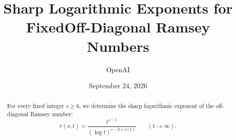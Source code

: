 \documentclass[11pt]{article}
\title{Sharp Logarithmic Exponents for Fixed\newline Off-Diagonal Ramsey Numbers}
\author{OpenAI}
\date{September 24, 2026}
\numberwithin{equation}{section}
\theoremstyle{definition}
\theoremstyle{remark}
\begin{document}
\maketitle
\begin{abstract}
For every fixed integer $s\ge6$, we determine the sharp logarithmic exponent
of the off-diagonal Ramsey number:
\[
 r(s,t)=\frac{t^{s-1}}{(\log t)^{s-2+o(1)}}
 \qquad (t\longrightarrow\infty).
\]
\end{abstract}
\tableofcontents
\clearpage








\end{document}
